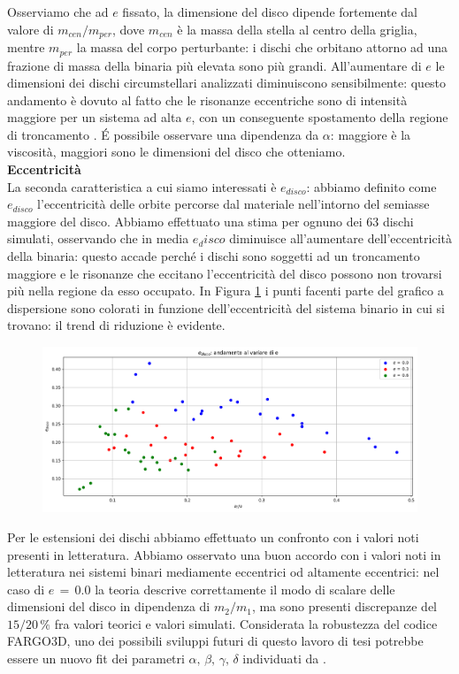 \documentclass[12pt, a4paper]{report}
\begin{document}
Osserviamo che ad $e$ fissato, la dimensione del disco dipende fortemente dal valore di $m_{cen}/m_{per}$, dove $m_{cen}$ è la massa della stella al centro della griglia, mentre $m_{per}$ la massa del corpo perturbante: i dischi che orbitano attorno ad una frazione di massa della binaria più elevata sono più grandi.
All'aumentare di $e$ le dimensioni dei dischi circumstellari analizzati diminuiscono sensibilmente: questo andamento è dovuto al fatto che le risonanze eccentriche sono di intensità maggiore per un sistema ad alta $e$, con un conseguente spostamento della regione di troncamento \parencite{ArtymowiczLubow1994}.
\'E possibile osservare una dipendenza da $\alpha$: maggiore è la viscosità, maggiori sono le dimensioni del disco che otteniamo.\\

\textbf{Eccentricità}\\

La seconda caratteristica a cui siamo interessati è $e_{disco}$: abbiamo definito come $e_{disco}$ l'eccentricità delle orbite percorse dal materiale nell'intorno del semiasse maggiore del disco.
Abbiamo effettuato una stima per ognuno dei 63 dischi simulati, osservando che in media $e_disco$ diminuisce all'aumentare dell'eccentricità della binaria: questo accade perché i dischi sono soggetti ad un troncamento maggiore e le risonanze che eccitano l'eccentricità del disco possono non trovarsi più nella regione da esso occupato. In Figura \ref{fig:rias_edisco} i punti facenti parte del grafico a dispersione sono colorati in funzione dell'eccentricità del sistema binario in cui si trovano: il trend di riduzione è evidente.

\begin{figure}[H]
    \centering
    \includegraphics[width=\textwidth]{Immagini/Risultati/riassuntivo_edisco.png}
    \caption{}
    \label{fig:rias_edisco}
\end{figure}


Per le estensioni dei dischi abbiamo effettuato un confronto con i valori noti presenti in letteratura.
Abbiamo osservato una buon accordo con i valori noti in letteratura nei sistemi binari mediamente eccentrici od altamente eccentrici: nel caso di $e\,=\,0.0$ la teoria descrive correttamente il modo di scalare delle dimensioni del disco in dipendenza di $m_2/m_1$, ma sono presenti discrepanze del $15/20\,\%$ fra valori teorici e valori simulati.
Considerata la robustezza del codice FARGO3D, uno dei possibili sviluppi futuri di questo lavoro di tesi potrebbe essere un nuovo fit dei parametri $\alpha,\,\beta,\,\gamma,\,\delta$ individuati da \cite{ManaraTronc2019}.
\end{document}
